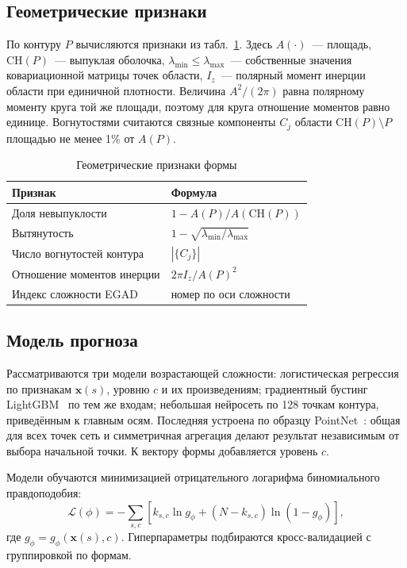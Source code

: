\documentclass{misisarticle}
\begin{document}
\subsection{Геометрические признаки}

По контуру $P$ вычисляются признаки из табл.~\ref{tab:features}. Здесь $A(\cdot)$~--- площадь, $\mathrm{CH}(P)$~--- выпуклая оболочка, $\lambda_{\min} \le \lambda_{\max}$~--- собственные значения ковариационной матрицы точек области, $I_z$~--- полярный момент инерции области при единичной плотности. Величина $A^2/(2\pi)$ равна полярному моменту круга той же площади, поэтому для круга отношение моментов равно единице. Вогнутостями считаются связные компоненты $C_j$ области $\mathrm{CH}(P) \setminus P$ площадью не менее 1\% от $A(P)$.

\begin{table}[htbp]
  \caption{Геометрические признаки формы}
  \label{tab:features}
  \centering
  \begin{tabular}{>{\raggedright\arraybackslash}p{}l}
    \toprule
    \textbf{Признак} & \textbf{Формула} \\
    \midrule
    Доля невыпуклости & $1 - A(P)/A(\mathrm{CH}(P))$ \\
    Вытянутость & $1 - \sqrt{\lambda_{\min}/\lambda_{\max}}$ \\
    Число вогнутостей контура & $|\{C_j\}|$ \\
    Отношение моментов инерции & $2\pi I_z / A(P)^2$ \\
    Индекс сложности EGAD & номер по оси сложности \\
    \bottomrule
  \end{tabular}
\end{table}

\subsection{Модель прогноза}

Рассматриваются три модели возрастающей сложности: логистическая регрессия по признакам $\mathbf{x}(s)$, уровню $c$ и их произведениям; градиентный бустинг LightGBM~\cite{lightgbm2017} по тем же входам; небольшая нейросеть по 128 точкам контура, приведённым к главным осям. Последняя устроена по образцу PointNet~\cite{pointnet2017}: общая для всех точек сеть и симметричная агрегация делают результат независимым от выбора начальной точки. К вектору формы добавляется уровень $c$.

Модели обучаются минимизацией отрицательного логарифма биномиального правдоподобия:
\begin{equation}
  \mathcal{L}(\phi) = -\sum_{s, c} \left[ k_{s,c} \ln g_\phi + (N - k_{s,c}) \ln (1 - g_\phi) \right],
  \label{eq:loss}
\end{equation}
где $g_\phi = g_\phi(\mathbf{x}(s), c)$. Гиперпараметры подбираются кросс-валидацией с группировкой по формам.
\end{document}
